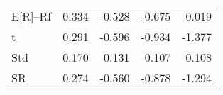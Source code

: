 \begin{tabular}{lrrrr}
\toprule
\midrule
E[R]--Rf & 0.334 & -0.528 & -0.675 & -0.019 \\
t & 0.291 & -0.596 & -0.934 & -1.377 \\
Std & 0.170 & 0.131 & 0.107 & 0.108 \\
SR & 0.274 & -0.560 & -0.878 & -1.294 \\
\bottomrule
\end{tabular}
